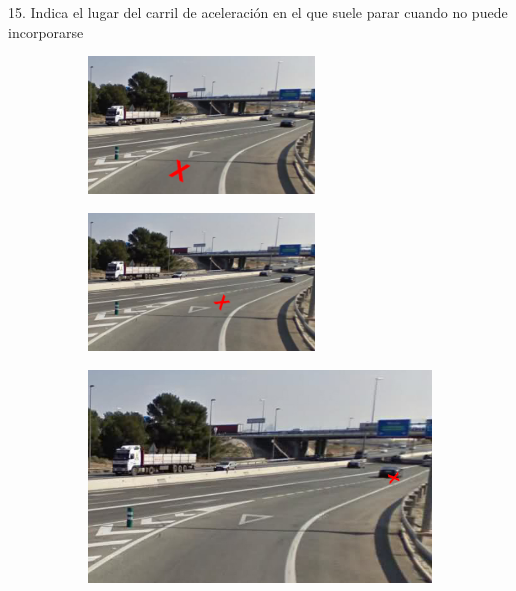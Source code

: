 15. Indica el lugar del carril de aceleración en el que suele parar cuando no puede incorporarse
\vspace{-10pt}
\begin{figure}[H]
    \centering
    \begin{subfigure}[b]{0.4\linewidth}
        \centering
        \includegraphics[width=6cm]{figures/A1.jpg}
        \caption{}
    \end{subfigure}
    \hspace{0.5cm}
    \begin{subfigure}[b]{0.4\linewidth}
        \centering
        \includegraphics[width=6cm]{figures/A2.jpg}
        \caption{}
    \end{subfigure}
    \begin{subfigure}[b]{0.45\textwidth}
        \centering
        \includegraphics[width=\textwidth]{figures/A3.jpg}
        \caption{}
  \end{subfigure}
\end{figure}


